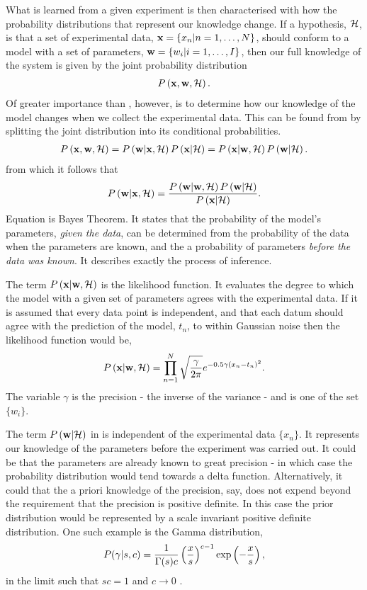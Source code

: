 What is learned from a given experiment is then characterised with how the probability distributions
that represent our knowledge change.
If a hypothesis, ${\cal H}$, is that a set of experimental data, $\mathbf{x} = \{x_n|n=1,\ldots,N\}$, should conform to a model with a set of parameters, $\mathbf{w} = \{w_i| i=1,\ldots,I\}$,
then our full knowledge of the system is given by the joint probability distribution
\begin{align}
  P\left( \mathbf{x},\mathbf{w},{\cal H} \right).
  \label{eqn:fullJointDist}
\end{align}
Of greater importance than , however,
is to determine how our knowledge of the model changes when we collect the experimental data.
This can be found from   by splitting the joint distribution into its conditional probabilities.
\begin{align}
  P\left( \mathbf{x},\mathbf{w},{\cal H} \right) = P\left( \mathbf{w}|\mathbf{x},{\cal H} \right)P\left( \mathbf{x}|{\cal H} \right)
  =  P\left( \mathbf{x}|\mathbf{w},{\cal H} \right) P\left( \mathbf{w}|{\cal H} \right).
\end{align}
from which it follows that 
\begin{align}
   P\left( \mathbf{w}|\mathbf{x},{\cal H} \right) =  \frac{P\left( \mathbf{w}|\mathbf{w},{\cal H} \right) P\left( \mathbf{w}|{\cal H} \right)}{P\left( \mathbf{x}|{\cal H} \right)}.
  \label{eqn:BayesTheorem}
\end{align}
Equation  is Bayes Theorem.
It states that the probability of the model's parameters, {\em given the data},
can be determined from the probability of the data when the parameters are known, and the a  probability of parameters {\em before the data was known}.
It describes exactly the process of inference.

The term $P\left( \mathbf{x}|\mathbf{w},{\cal H} \right)$ is the likelihood function.
It evaluates the degree to which the model with a given set of parameters agrees with the experimental data.
If it is assumed that every data point is independent, and that each datum should agree with the prediction of the model, $t_n$, 
to within Gaussian noise
then the likelihood function would be,
\begin{align}
  P\left( \mathbf{x}|\mathbf{w},{\cal H} \right) = \prod_{n=1}^N \sqrt{\frac{\gamma}{2\pi}}e^{-0.5\gamma\left( x_n-t_n \right)^2}.
\end{align}
The variable $\gamma$ is the precision - the inverse of the variance - and is one of the set $\{w_i\}$.

The term $P\left( \mathbf{w}|{\cal H} \right)$ in  is independent of the experimental data $\{x_n\}$.  
It  represents our knowledge of the parameters before the experiment was carried out.
It could be that the parameters are already known to great precision - 
in which case the probability distribution would tend towards a delta function.
Alternatively, it could that the a priori knowledge of the precision, say, 
does not expend beyond the requirement that the precision is positive definite.
In this case the prior distribution would be represented by a scale invariant positive definite distribution.
One such example is the Gamma distribution,
\begin{align}
  P(\gamma|s,c) = \frac{1}{\Gamma(s)c}\left( \frac{x}{s} \right)^{c-1}\exp\left( -\frac{x}{s} \right),
\label{eqn:Gamma}
\end{align}
in the limit such that $sc = 1$ and $c\rightarrow 0$ \cite{MacKay2003}.

